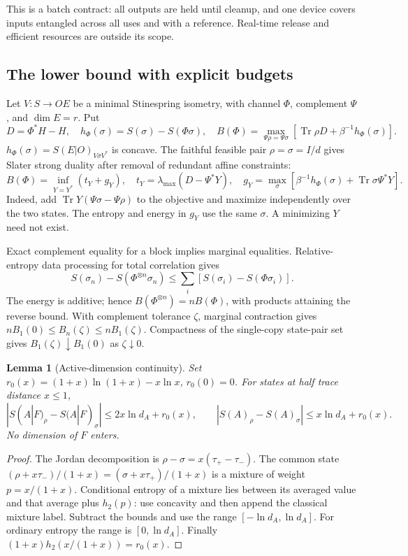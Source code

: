 \documentclass[11pt]{article}
\newtheorem{lemma}[theorem]{Lemma}
\theoremstyle{definition}
\theoremstyle{remark}
\newcommand{\Tr}{\operatorname{Tr}}
\providecommand{\h}{h_2}
\begin{document}
This is a batch contract: all outputs are held until cleanup, and one device
covers inputs entangled across all uses and with a reference. Real-time
release and efficient resources are outside its scope.

\subsection{The lower bound with explicit budgets}
Let $V:S\to OE$ be a minimal Stinespring isometry, with channel $\Phi$,
complement $\Psi$, and $\dim E=r$. Put
\[
 D=\Phi^*H-H,\quad h_\Phi(\sigma)=S(\sigma)-S(\Phi\sigma),\quad
 B(\Phi)=\max_{\Psi\rho=\Psi\sigma}
       [\Tr\rho D+\beta^{-1}h_\Phi(\sigma)].
\]
$h_\Phi(\sigma)=S(E|O)_{V\sigma V^*}$ is concave. The faithful feasible
pair $\rho=\sigma=I/d$ gives Slater strong duality after removal of
redundant affine constraints:
\begin{equation}\label{bp-dual}
 B(\Phi)=\inf_{Y=Y^*}(t_Y+g_Y),\quad
 t_Y=\lambda_{\max}(D-\Psi^*Y),\quad
 g_Y=\max_\sigma[\beta^{-1}h_\Phi(\sigma)+\Tr\sigma\Psi^*Y].
\end{equation}
Indeed, add $\Tr Y(\Psi\sigma-\Psi\rho)$ to the objective and maximize
independently over the two states. The entropy and energy in $g_Y$
use the same $\sigma$. A minimizing $Y$ need not exist.

Exact complement equality for a block implies marginal equalities.
Relative-entropy data processing for total correlation gives
\[
 S(\sigma_n)-S(\Phi^{\otimes n}\sigma_n)
 \le\sum_i[S(\sigma_i)-S(\Phi\sigma_i)].
\]
The energy is additive; hence $B(\Phi^{\otimes n})=nB(\Phi)$, with
products attaining the reverse bound. With complement tolerance $\zeta$,
marginal contraction gives $nB_1(0)\le B_n(\zeta)\le nB_1(\zeta)$.
Compactness of the single-copy state-pair set gives
$B_1(\zeta)\downarrow B_1(0)$ as $\zeta\downarrow0$.


\begin{lemma}[Active-dimension continuity]\label{bp-continuity}
Set $r_0(x)=(1+x)\ln(1+x)-x\ln x$, $r_0(0)=0$.
For states at half trace distance $x\le1$,
\[
 |S(A|F)_\rho-S(A|F)_\sigma|\le2x\ln d_A+r_0(x),\qquad
 |S(A)_\rho-S(A)_\sigma|\le x\ln d_A+r_0(x).
\]
No dimension of $F$ enters.
\end{lemma}
\begin{proof}
The Jordan decomposition is $\rho-\sigma=x(\tau_+-\tau_-)$.
The common state $(\rho+x\tau_-)/(1+x)=(\sigma+x\tau_+)/(1+x)$ is a
mixture of weight $p=x/(1+x)$. Conditional entropy of a mixture lies
between its averaged value and that average plus $\h(p)$: use concavity
and then append the classical mixture label. Subtract the bounds and
use the range $[-\ln d_A,\ln d_A]$. For ordinary entropy the range is
$[0,\ln d_A]$. Finally $(1+x)\h(x/(1+x))=r_0(x)$.
\end{proof}
\end{document}
